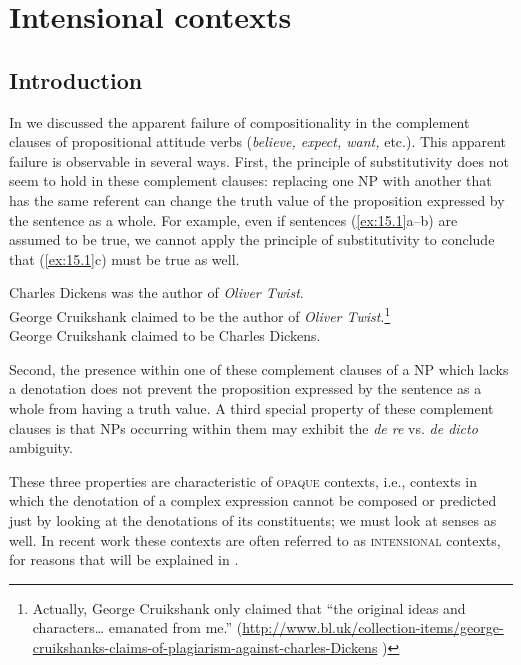 \chapter{Intensional contexts}\label{sec:15}

\section{Introduction}\label{sec:15.1}

In  we discussed the apparent failure of compositionality in the complement clauses of propositional attitude verbs (\textit{believe, expect, want,} etc.). This apparent failure is observable in several ways. First, the principle of substitutivity does not seem to hold in these complement clauses: replacing one NP with another that has the same referent can change the truth value of the proposition expressed by the sentence as a whole. For example, even if sentences (\ref{ex:15.1}a--b) are assumed to be true, we cannot apply the principle of substitutivity to conclude that (\ref{ex:15.1}c) must be true as well.


\ea \label{ex:15.1}
\ea  Charles Dickens was the author of \textit{Oliver Twist}.\\
\ex George Cruikshank claimed to be the author of \textit{Oliver Twist}.\footnote{Actually, George Cruikshank only claimed that “the original ideas and characters… emanated from me.” (\url{http://www.bl.uk/collection-items/george-cruikshanks-claims-of-plagiarism-against-charles-Dickens} )}\\
\ex George Cruikshank claimed to be Charles Dickens.
                       \z
\z


Second, the presence within one of these complement clauses of a NP which lacks a denotation does not prevent the proposition expressed by the sentence as a whole from having a truth value. A third special property of these complement clauses is that NPs occurring within them may exhibit the \textit{de re} vs. \textit{de dicto} ambiguity.



These three properties are characteristic of \textsc{opaque} contexts, i.e., contexts in which the denotation of a complex expression cannot be composed or predicted just by looking at the denotations of its constituents; we must look at senses as well. In recent work these contexts are often referred to as \textsc{intensional} contexts, for reasons that will be explained in .



